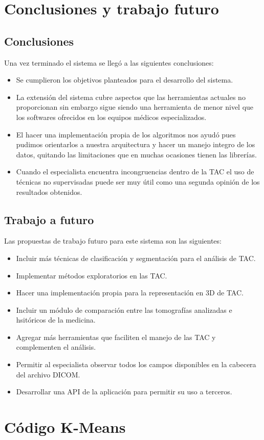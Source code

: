 \documentclass[12pt]{report}
\begin{document}
\chapter{Conclusiones y trabajo futuro}
\section{Conclusiones}
Una vez terminado el sistema se llegó a las siguientes conclusiones:
\begin{itemize}
\item Se cumplieron los objetivos planteados para el desarrollo del sistema.
\item La extensión del sistema cubre aspectos que las herramientas actuales no proporcionan sin embargo sigue siendo una herramienta de menor nivel que los softwares ofrecidos en los equipos médicos especializados.
\item El hacer una implementación propia de los algoritmos nos ayudó pues pudimos orientarlos a nuestra arquitectura y hacer un manejo integro de los datos, quitando las limitaciones que en muchas ocasiones tienen las librerías.
\item Cuando el especialista encuentra incongruencias dentro de la TAC el uso de técnicas no supervisadas puede ser muy útil como una segunda opinión de los resultados obtenidos.
\end{itemize}


\section{Trabajo a futuro}
Las propuestas de trabajo futuro para este sistema son las siguientes:
\begin{itemize}
\item Incluir más técnicas de clasificación y segmentación para el análisis de TAC.
\item Implementar métodos exploratorios en las TAC.
\item Hacer una implementación propia para la representación en 3D de TAC.
\item Incluir un módulo de comparación entre las tomografías analizadas e hsitóricos de la medicina.
\item Agregar más herramientas que faciliten el manejo de las TAC y complementen el análisis.
\item Permitir al especialista observar todos los campos disponibles en la cabecera del archivo DICOM.
\item Desarrollar una API de la aplicación para permitir su uso a terceros.
\end{itemize}

\appendix
\chapter{Código K-Means}
\lstset{language=C#, breaklines=true, basicstyle=\footnotesize}
\lstset{numbers=left, numberstyle=\tiny, stepnumber=1, numbersep=-2pt}
\begin{lstlisting}[frame=single]

\end{lstlisting}



\end{document}
